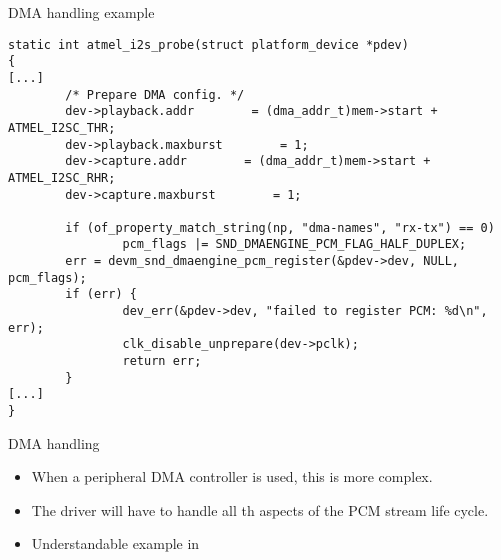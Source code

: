 \begin{frame}[fragile]{DMA handling example}
  \begin{block}{}
    \fontsize{8}{8}\selectfont
    \begin{verbatim}
static int atmel_i2s_probe(struct platform_device *pdev)
{
[...]
        /* Prepare DMA config. */
        dev->playback.addr        = (dma_addr_t)mem->start + ATMEL_I2SC_THR;
        dev->playback.maxburst        = 1;
        dev->capture.addr        = (dma_addr_t)mem->start + ATMEL_I2SC_RHR;
        dev->capture.maxburst        = 1;

        if (of_property_match_string(np, "dma-names", "rx-tx") == 0)
                pcm_flags |= SND_DMAENGINE_PCM_FLAG_HALF_DUPLEX;
        err = devm_snd_dmaengine_pcm_register(&pdev->dev, NULL, pcm_flags);
        if (err) {
                dev_err(&pdev->dev, "failed to register PCM: %d\n", err);
                clk_disable_unprepare(dev->pclk);
                return err;
        }
[...]
}
    \end{verbatim}
  \end{block}
\end{frame}

\begin{frame}{DMA handling}
  \begin{itemize}
  \item When a peripheral DMA controller is used, this is more
    complex.
  \item The driver will have to handle all th aspects of the PCM
    stream life cycle.
  \item Understandable example in 
  \end{itemize}
\end{frame}


